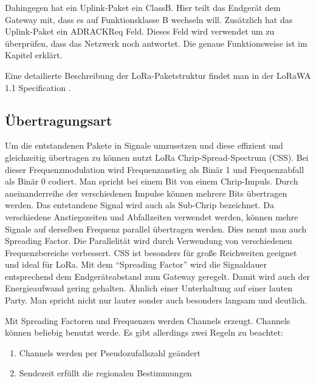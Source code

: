 \documentclass[a4paper,12pt]{article}
\begin{document}
                Dahingegen hat ein Uplink-Paket ein ClassB. Hier teilt das Endgerät dem Gateway mit, dass es auf 
                Funktionsklasse B wechseln will. Zusätzlich hat das Uplink-Paket ein ADRACKReq Feld. Dieses Feld 
                wird verwendet um zu überprüfen, dass das Netzwerk noch antwortet. 
                Die genaue Funktionsweise ist im Kapitel  erklärt.

                Eine detailierte Beschreibung der LoRa-Paketstruktur findet man in der LoRaWA 1.1 Specification \cite{LoRaSpec}.   
                
                
        \subsection{Übertragungsart}\label{sec:Modulation}
            Um die entstandenen Pakete in Signale umzusetzen und diese effizient und gleichzeitig übertragen zu können
            nutzt LoRa Chrip-Spread-Spectrum (CSS). Bei dieser Frequenzmodulation wird Frequenzanstieg als Binär 1 und 
            Frequenzabfall als Binär 0 codiert. Man spricht bei einem Bit von einem Chrip-Impuls. Durch 
            aneinanderreihe der verschiedenen Impulse können mehrere Bits übertragen werden. Das entstandene Signal 
            wird auch als Sub-Chrip bezeichnet. Da verschiedene Anstiegszeiten und Abfallzeiten verwendet werden, können  
            mehre Signale auf derselben Frequenz parallel übertragen werden. Dies nennt man auch Spreading Factor. 
            Die Parallelität wird durch Verwendung von verschiedenen Frequenzbereiche verbessert. 
            CSS ist besonders für große Reichweiten geeignet und ideal für LoRa. 
            Mit dem ``Spreading Factor'' wird die Signaldauer entsprechend dem Endgeräteabstand zum Gateway geregelt.
            Damit wird auch der Energieaufwand gering gehalten. Ähnlich einer Unterhaltung auf einer lauten Party. 
            Man spricht nicht nur lauter sonder auch besonders langsam und deutlich.\cite{explain}

            Mit Spreading Factoren und Frequenzen werden Channels erzeugt. Channels können 
            beliebig benutzt werde. Es gibt allerdings zwei Regeln zu beachtet: 
            \begin{enumerate}   
                \item Channels werden per Pseudozufallszahl geändert
                \item Sendezeit erfüllt die regionalen Bestimmungen
            \end{enumerate}
            
\end{document}
